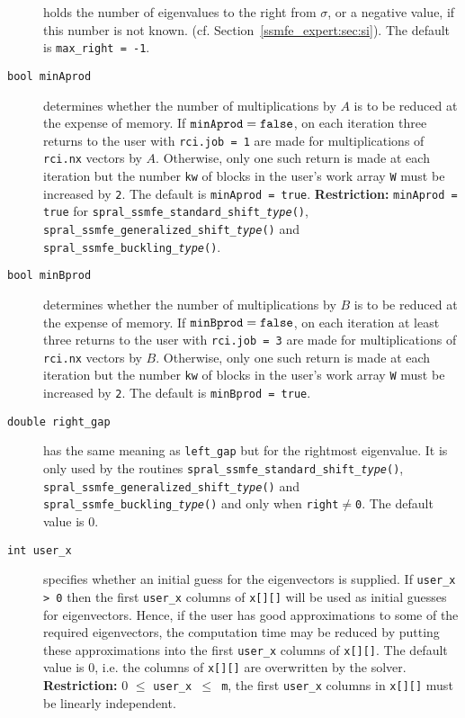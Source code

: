 \begin{description}
holds the number of eigenvalues to the right from $\sigma$,
or a negative value, if this number is not known.
(cf. Section~\ref{ssmfe_expert:sec:si}).
The default is {\tt max\_right = -1}.
%
\item[\texttt{bool minAprod}]
determines whether the number of multiplications by $A$ 
is to be reduced at the expense of memory. 
If ${\tt minAprod = false}$, 
on each iteration three returns to the user
with {\tt rci.job = 1} are
made for multiplications of {\tt rci.nx} vectors by $A$.
Otherwise,  only one such return is made at each iteration but 
the number {\tt kw} of blocks in the user's work array {\tt W} 
must be increased by {\tt 2}.
The default is {\tt minAprod~=~true}.
{\bf Restriction:} {\tt minAprod = true}
for {\tt spral\_ssmfe\_standard\_shift\_\textit{type}()},\\
{\tt spral\_ssmfe\_generalized\_shift\_\textit{type}()}
and  {\tt spral\_ssmfe\_buckling\_\textit{type}()}.
%
\item[\texttt{bool minBprod}]
determines whether the number of multiplications by $B$ 
is to be reduced at the expense of memory. 
If ${\tt minBprod = false}$, 
on each iteration at least three returns to the user
with {\tt rci.job = 3} are
made for multiplications of {\tt rci.nx} vectors by $B$.
Otherwise,  only one such return is made at each iteration but 
the number {\tt kw} of blocks in the user's work array {\tt W} 
must be increased by {\tt 2}.
The default is {\tt minBprod = true}.
%
\item[\texttt{double right\_gap}] has the same meaning as {\tt left\_gap} but for the rightmost eigenvalue. It is only used by the routines
{\tt spral\_ssmfe\_standard\_shift\_\textit{type}()}, {\tt spral\_ssmfe\_generalized\_shift\_\textit{type}()}
and {\tt spral\_ssmfe\_buckling\_\textit{type}()}
and only when {\tt right}$\ne${\tt 0}.
The default value is 0.
%
\item[\texttt{int user\_x}] specifies whether an initial guess for the eigenvectors is supplied.
If {\tt user\_x > 0} then the first {\tt user\_x} columns
of {\tt x[][]} will be used as initial guesses for eigenvectors.
Hence, if the user has good approximations
to some of the required eigenvectors, the computation time
may be reduced by putting these approximations
into the first {\tt user\_x} columns of {\tt x[][]}.
The default value is 0, 
i.e. the columns of {\tt x[][]} are overwritten by the solver.
{\bf Restriction:} {0 $\le$ \tt user\_x $\le$ m},
the first {\tt user\_x} columns in {\tt x[][]}
must be linearly independent.
%
\end{description}

